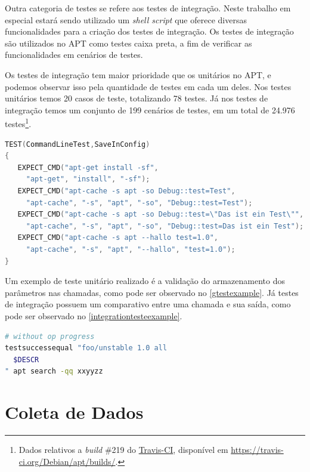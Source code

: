 Outra categoria de testes se refere aos testes de integração. Neste trabalho em especial estará sendo utilizado um \textit{shell script} que oferece diversas funcionalidades para a criação dos testes de integração. Os testes de integração são utilizados no {\code APT} como testes caixa preta, a fim de verificar as funcionalidades em cenários de testes.

Os testes de integração tem maior prioridade que os unitários no APT, e podemos observar isso pela quantidade de testes em cada um deles. Nos testes unitários temos 20 casos de teste, totalizando 78 testes. Já nos testes de integração temos um conjunto de 199 cenários de testes, em um total de 24.976 testes\footnote{Dados relativos a \textit{build} \#219 do \href{https://travis-ci.org/Debian/apt/builds/}{Travis-CI}, disponível em \url{https://travis-ci.org/Debian/apt/builds/}.}.


\begin{lstlisting}[language=C++,label=gtestexample,caption={Teste de validação de armazenamento de parâmetros}]
TEST(CommandLineTest,SaveInConfig)
{
   EXPECT_CMD("apt-get install -sf",
	 "apt-get", "install", "-sf");
   EXPECT_CMD("apt-cache -s apt -so Debug::test=Test",
	 "apt-cache", "-s", "apt", "-so", "Debug::test=Test");
   EXPECT_CMD("apt-cache -s apt -so Debug::test=\"Das ist ein Test\"",
	 "apt-cache", "-s", "apt", "-so", "Debug::test=Das ist ein Test");
   EXPECT_CMD("apt-cache -s apt --hallo test=1.0",
	 "apt-cache", "-s", "apt", "--hallo", "test=1.0");
}
\end{lstlisting}

Um exemplo de teste unitário realizado é a validação do armazenamento dos parâmetros nas chamadas, como pode ser observado no \autoref{gtestexample}. Já testes de integração possuem um comparativo entre uma chamada e sua saída, como pode ser observado no \autoref{integrationtesteexample}.

\begin{lstlisting}[language=Bash,label=integrationtesteexample,caption={Teste de verificação de saída para busca}]
# without op progress
testsuccessequal "foo/unstable 1.0 all
  $DESCR
" apt search -qq xxyyzz
\end{lstlisting}



\section{Coleta de Dados} %
\label{cha:coleta_de_dados}

